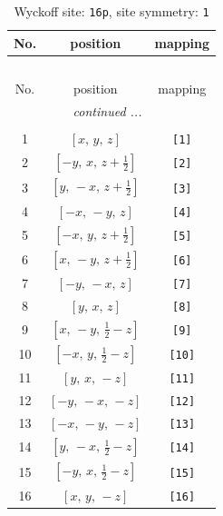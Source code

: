 \documentclass[fleqn,8pt]{jsarticle}
\begin{document}
\begin{longtable}{ccc}
\caption{Wyckoff site: {\tt 16p}, site symmetry: {\tt 1}}
 \\
 \hline \hline
No. & position & mapping \\ \hline \endfirsthead

\multicolumn{2}{l}{\tablename\ \thetable{}} \\
 \hline \hline
No. & position & mapping \\ \hline \endhead

 \hline \hline
\multicolumn{2}{r}{\footnotesize\it continued ...} \\ \endfoot

 \hline \hline
\multicolumn{2}{r}{} \\ \endlastfoot

1 & $\left[ x,\, y,\, z \right]$ & {\tt [1]} \\ \hline
2 & $\left[ - y,\, x,\, z + \frac{1}{2} \right]$ & {\tt [2]} \\ \hline
3 & $\left[ y,\, - x,\, z + \frac{1}{2} \right]$ & {\tt [3]} \\ \hline
4 & $\left[ - x,\, - y,\, z \right]$ & {\tt [4]} \\ \hline
5 & $\left[ - x,\, y,\, z + \frac{1}{2} \right]$ & {\tt [5]} \\ \hline
6 & $\left[ x,\, - y,\, z + \frac{1}{2} \right]$ & {\tt [6]} \\ \hline
7 & $\left[ - y,\, - x,\, z \right]$ & {\tt [7]} \\ \hline
8 & $\left[ y,\, x,\, z \right]$ & {\tt [8]} \\ \hline
9 & $\left[ x,\, - y,\, \frac{1}{2} - z \right]$ & {\tt [9]} \\ \hline
10 & $\left[ - x,\, y,\, \frac{1}{2} - z \right]$ & {\tt [10]} \\ \hline
11 & $\left[ y,\, x,\, - z \right]$ & {\tt [11]} \\ \hline
12 & $\left[ - y,\, - x,\, - z \right]$ & {\tt [12]} \\ \hline
13 & $\left[ - x,\, - y,\, - z \right]$ & {\tt [13]} \\ \hline
14 & $\left[ y,\, - x,\, \frac{1}{2} - z \right]$ & {\tt [14]} \\ \hline
15 & $\left[ - y,\, x,\, \frac{1}{2} - z \right]$ & {\tt [15]} \\ \hline
16 & $\left[ x,\, y,\, - z \right]$ & {\tt [16]} \\
\end{longtable}
\end{document}
